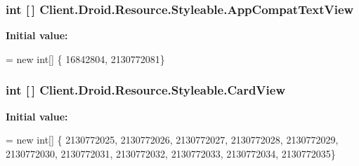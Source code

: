 \subsubsection[{App\+Compat\+Text\+View}]{\setlength{\rightskip}{0pt plus 5cm}int \mbox{[}$\,$\mbox{]} Client.\+Droid.\+Resource.\+Styleable.\+App\+Compat\+Text\+View\hspace{0.3cm}{\ttfamily [static]}}\label{classClient_1_1Droid_1_1Resource_1_1Styleable_a76266a6a3df3be25af14e6a5a770655c}
{\bfseries Initial value\+:}
\begin{DoxyCode}
= \textcolor{keyword}{new} \textcolor{keywordtype}{int}[]
            \{
                    16842804,
                    2130772081\}
\end{DoxyCode}
\hypertarget{classClient_1_1Droid_1_1Resource_1_1Styleable_abb1448355fdfcaa64b3630d63b949e38}{}
\subsubsection[{Card\+View}]{\setlength{\rightskip}{0pt plus 5cm}int \mbox{[}$\,$\mbox{]} Client.\+Droid.\+Resource.\+Styleable.\+Card\+View\hspace{0.3cm}{\ttfamily [static]}}\label{classClient_1_1Droid_1_1Resource_1_1Styleable_abb1448355fdfcaa64b3630d63b949e38}
{\bfseries Initial value\+:}
\begin{DoxyCode}
= \textcolor{keyword}{new} \textcolor{keywordtype}{int}[]
            \{
                    2130772025,
                    2130772026,
                    2130772027,
                    2130772028,
                    2130772029,
                    2130772030,
                    2130772031,
                    2130772032,
                    2130772033,
                    2130772034,
                    2130772035\}
\end{DoxyCode}
\hypertarget{classClient_1_1Droid_1_1Resource_1_1Styleable_aecb05c92cdd5a5b5699ee2ba9df1aeee}{}
